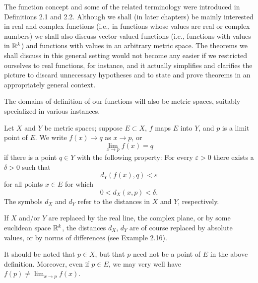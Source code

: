 \noindent
The function concept and some of the related terminology were introduced in
Definitions 2.1 and 2.2. Although we shall (in later chapters) be mainly
interested in real and complex functions (i.e., in functions whose values are
real or complex numbers) we shall also discuss vector-valued functions (i.e.,
functions with values in $\mathbb{R}^k$) and functions with values in an arbitrary
metric space. The theorems we shall discuss in this general setting would not
become any easier if we restricted ourselves to real functions, for instance,
and it actually simplifies and clarifies the picture to discard unnecessary
hypotheses and to state and prove theorems in an appropriately general
context.

The domains of definition of our functions will also be metric spaces,
suitably specialized in various instances.


Let $X$ and $Y$ be metric spaces; suppose $E \subset X$, $f$ maps $E$ into
$Y$, and $p$ is a limit point of $E$. We write $f(x) \to q$ as $x \to p$, or
\begin{equation}
  \lim_{x\to p} f(x) = q \tag{4.1}
\end{equation}
if there is a point $q \in Y$ with the following property: For every
$\varepsilon > 0$ there exists a $\delta > 0$ such that
\begin{equation}
  d_Y(f(x),q) < \varepsilon \tag{4.2}
\end{equation}
for all points $x \in E$ for which
\begin{equation}
  0 < d_X(x,p) < \delta. \tag{4.3}
\end{equation}
The symbols $d_X$ and $d_Y$ refer to the distances in $X$ and $Y$,
respectively.

If $X$ and/or $Y$ are replaced by the real line, the complex plane, or by some
euclidean space $\mathbb{R}^k$, the distances $d_X$, $d_Y$ are of course replaced by
absolute values, or by norms of differences (see Example 2.16).

It should be noted that $p \in X$, but that $p$ need not be a point of $E$ in
the above definition. Moreover, even if $p \in E$, we may very well have
$f(p) \ne \lim_{x\to p} f(x)$.


